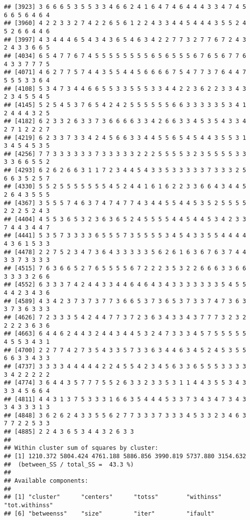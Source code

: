 \documentclass[
]{article}
\begin{document}
\begin{verbatim}
## [3923] 3 6 6 6 5 3 5 5 3 3 4 6 6 2 4 1 6 4 7 4 6 4 4 4 3 3 4 7 4 5 6 6 5 6 4 6 4
## [3960] 4 2 2 3 3 2 7 4 2 2 6 5 6 1 2 2 4 3 3 4 4 5 4 4 4 3 5 5 2 4 5 2 6 6 4 4 6
## [3997] 4 3 4 4 4 6 5 4 3 4 3 6 5 4 6 3 4 2 2 7 7 3 2 7 7 6 7 2 4 3 2 4 3 3 6 6 5
## [4034] 6 5 4 7 7 6 7 4 5 5 5 5 5 5 5 5 6 5 6 5 5 5 6 7 6 5 6 7 7 6 4 3 3 7 7 7 5
## [4071] 4 6 2 7 7 5 7 4 4 3 5 5 4 4 5 6 6 6 6 7 5 4 7 7 3 7 6 4 4 7 5 5 5 3 3 6 4
## [4108] 5 3 4 7 3 4 4 6 6 5 5 3 3 5 5 5 3 3 4 4 2 2 3 6 2 2 3 3 4 3 2 3 4 5 5 4 5
## [4145] 5 2 5 4 5 3 7 6 5 4 2 4 2 5 5 5 5 5 5 6 6 3 3 3 3 3 5 3 4 1 2 4 4 4 3 2 5
## [4182] 6 2 3 3 2 6 3 3 7 3 6 6 6 6 3 3 4 2 6 6 3 3 4 5 3 5 4 3 3 4 2 7 1 2 2 2 7
## [4219] 6 2 3 3 7 3 3 4 2 4 5 6 6 3 3 4 4 5 5 6 5 4 5 4 4 3 5 5 3 1 3 4 5 4 5 3 5
## [4256] 7 7 3 3 3 3 3 3 7 3 3 3 3 3 2 2 2 5 5 5 5 3 2 3 5 5 5 5 3 3 3 3 6 6 5 5 2
## [4293] 6 2 6 2 6 6 3 1 1 7 2 3 4 4 5 4 3 3 5 3 3 3 3 3 7 3 3 3 2 5 6 6 3 5 2 5 7
## [4330] 5 5 2 5 5 5 5 5 5 5 4 5 2 4 4 1 6 1 6 2 2 3 3 6 6 4 3 4 4 5 2 6 4 3 5 5 5
## [4367] 3 5 5 5 7 4 6 3 7 4 7 4 7 7 4 3 4 4 5 5 4 4 5 3 5 2 5 5 5 5 2 2 2 5 2 4 3
## [4404] 4 5 5 3 6 5 3 2 3 6 3 6 5 2 4 5 5 5 5 4 4 5 4 4 5 3 4 2 3 3 7 4 4 3 4 4 7
## [4441] 5 3 5 7 3 3 3 3 6 5 5 5 7 3 5 5 5 5 3 4 5 4 3 3 5 5 4 4 4 4 4 3 6 1 5 3 3
## [4478] 2 2 7 5 2 3 4 7 3 6 4 3 3 3 3 3 5 6 2 6 1 6 3 6 7 6 3 7 4 4 3 3 7 3 3 3 3
## [4515] 7 6 3 6 6 5 2 7 6 5 5 5 5 6 7 2 2 2 3 5 3 2 2 6 6 6 3 3 6 6 3 3 3 3 2 6 6
## [4552] 6 3 3 3 7 4 2 4 4 3 3 4 4 6 4 6 4 3 4 3 3 3 3 3 3 3 5 4 5 5 4 4 2 3 4 3 6
## [4589] 4 3 4 2 3 7 3 7 3 7 7 3 6 6 5 3 7 3 6 5 3 7 3 3 7 4 7 3 6 3 3 7 3 6 3 3 3
## [4626] 7 2 3 3 3 5 4 2 4 4 7 7 3 7 2 3 6 3 4 3 3 4 3 7 7 7 3 2 3 2 2 2 2 3 6 3 6
## [4663] 6 4 4 6 2 4 4 3 2 4 4 3 4 4 5 3 2 4 7 3 3 3 4 5 7 5 5 5 5 5 4 5 5 3 4 3 1
## [4700] 2 2 7 7 4 2 7 3 5 4 3 3 5 7 3 3 6 3 4 4 6 3 4 5 2 4 5 3 5 5 6 6 3 3 4 3 3
## [4737] 3 3 3 3 4 4 4 4 4 2 2 4 5 5 4 2 3 4 5 6 3 3 6 5 5 5 3 3 3 3 3 4 2 2 2 2 2
## [4774] 3 6 4 4 3 5 7 7 7 5 5 2 6 3 3 2 3 3 5 3 1 1 4 4 3 5 5 3 4 3 3 3 4 5 6 6 4
## [4811] 4 4 3 1 3 7 5 3 3 3 1 6 6 3 5 4 4 4 5 3 3 7 3 4 3 4 7 3 4 3 3 4 3 3 3 1 3
## [4848] 3 6 2 6 2 4 3 3 5 5 6 2 7 7 3 3 3 7 3 3 3 4 5 3 3 2 3 4 6 3 7 7 2 2 5 3 3
## [4885] 2 2 4 3 6 5 3 4 4 3 2 6 3 3
## 
## Within cluster sum of squares by cluster:
## [1] 1210.372 5804.424 4761.188 5886.856 3990.819 5737.880 3154.632
##  (between_SS / total_SS =  43.3 %)
## 
## Available components:
## 
## [1] "cluster"      "centers"      "totss"        "withinss"     "tot.withinss"
## [6] "betweenss"    "size"         "iter"         "ifault"
\end{verbatim}
\end{document}
